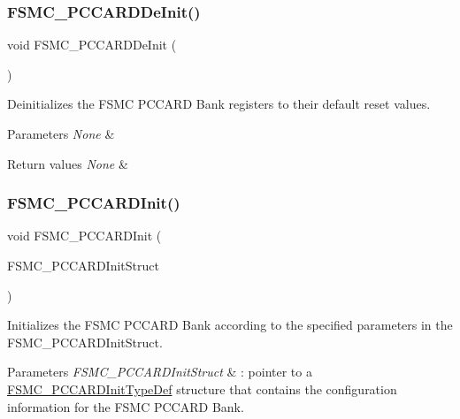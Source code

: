 \subsubsection{\texorpdfstring{FSMC\_PCCARDDeInit()}{FSMC\_PCCARDDeInit()}}
{\footnotesize\ttfamily void F\+S\+M\+C\+\_\+\+P\+C\+C\+A\+R\+D\+De\+Init (\begin{DoxyParamCaption}\item[{void}]{ }\end{DoxyParamCaption})}



Deinitializes the F\+S\+MC P\+C\+C\+A\+RD Bank registers to their default reset values. 


\begin{DoxyParams}{Parameters}
{\em None} & \\
\hline
\end{DoxyParams}

\begin{DoxyRetVals}{Return values}
{\em None} & \\
\hline
\end{DoxyRetVals}
\mbox{\label{group___f_s_m_c___exported___functions_gacee1351363e7700a296faa1734a910aa}} 
\subsubsection{\texorpdfstring{FSMC\_PCCARDInit()}{FSMC\_PCCARDInit()}}
{\footnotesize\ttfamily void F\+S\+M\+C\+\_\+\+P\+C\+C\+A\+R\+D\+Init (\begin{DoxyParamCaption}\item[{\mbox{\hyperlink{struct_f_s_m_c___p_c_c_a_r_d_init_type_def}{F\+S\+M\+C\+\_\+\+P\+C\+C\+A\+R\+D\+Init\+Type\+Def}} $\ast$}]{F\+S\+M\+C\+\_\+\+P\+C\+C\+A\+R\+D\+Init\+Struct }\end{DoxyParamCaption})}



Initializes the F\+S\+MC P\+C\+C\+A\+RD Bank according to the specified parameters in the F\+S\+M\+C\+\_\+\+P\+C\+C\+A\+R\+D\+Init\+Struct. 


\begin{DoxyParams}{Parameters}
{\em F\+S\+M\+C\+\_\+\+P\+C\+C\+A\+R\+D\+Init\+Struct} & \+: pointer to a \mbox{\hyperlink{struct_f_s_m_c___p_c_c_a_r_d_init_type_def}{F\+S\+M\+C\+\_\+\+P\+C\+C\+A\+R\+D\+Init\+Type\+Def}} structure that contains the configuration information for the F\+S\+MC P\+C\+C\+A\+RD Bank.\\
\hline
\end{DoxyParams}

